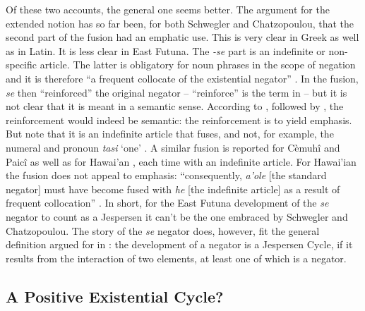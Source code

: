 ﻿\documentclass[output=paper]{langsci/langscibook}
\begin{document}
Of these two accounts, the general one seems better. The argument for the
extended notion has so far been, for both Schwegler
and Chatzopoulou, that
the second part of the fusion had an emphatic use. This is very clear in
Greek as well as in Latin. It is less clear in
East Futuna. The
\textit{-se} part is an indefinite or non-specific article. The latter is
obligatory for noun phrases in the scope of negation and it is therefore ``a
frequent collocate of the existential negator''
\parencite[1348]{Veselinova2014}. In the fusion, \textit{se} then
``reinforced'' the original negator -- ``reinforce'' is the term in
\textcite[122]{MoyseFaurie1999} -- but it is not clear that it is meant in a
semantic sense. According to \textcite[18]{Mosel1999}, followed by
\textcite[1363]{Veselinova2014}, the reinforcement would indeed be
semantic: the reinforcement is to yield emphasis. But note that it is an
indefinite article that fuses, and not, for example, the numeral and
pronoun \textit{tasi} `one' \parencites[27,
35]{MoyseFaurie1997}[121]{MoyseFaurie1999}. A similar fusion is reported
for Cèmuhî and Paicî \parencite[63]{MoyseFaurieOzanneRivierre1999} as well
as for Hawai'an \parencite[1348]{Veselinova2014}, each time with an
indefinite article. For
Hawai'ian the fusion does not appeal to emphasis: ``consequently,
\textit{a'ole} [the standard negator] must have become fused with
\textit{he} [the indefinite article] as a result of frequent
collocation'' \parencite[1348]{Veselinova2014}. In short, for the East Futuna
development of the \textit{se} negator to count as a Jespersen it can't be
the one embraced by Schwegler and
Chatzopoulou. The story of the
\textit{se} negator does, however, fit the general definition argued for in
: the development of a negator is a Jespersen Cycle, if it results
from the interaction of two elements, at least one of which is a negator.

\subsection{A Positive Existential Cycle?}\label{sec:int-4.3}
\end{document}
